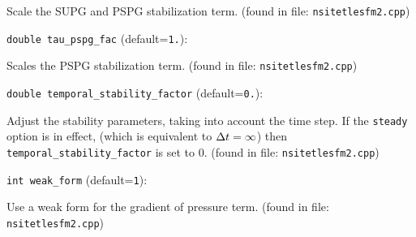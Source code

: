 Scale the SUPG and PSPG stabilization term. 
 (found in file: \verb+nsitetlesfm2.cpp+)
\item\verb+double tau_pspg_fac+ {\rm(default=\verb|1.|)}:

Scales the PSPG stabilization term. 
 (found in file: \verb+nsitetlesfm2.cpp+)
\item\verb+double temporal_stability_factor+ {\rm(default=\verb|0.|)}:

Adjust the stability parameters, taking into account
the time step. If the  \verb+steady+  option is in effect,
(which is equivalent to ${\Delta t}=\infty$) then
 \verb+temporal_stability_factor+  is set to 0.
 (found in file: \verb+nsitetlesfm2.cpp+)
\item\verb+int weak_form+ {\rm(default=\verb|1|)}:

Use a weak form for the gradient of pressure term.
 (found in file: \verb+nsitetlesfm2.cpp+)
